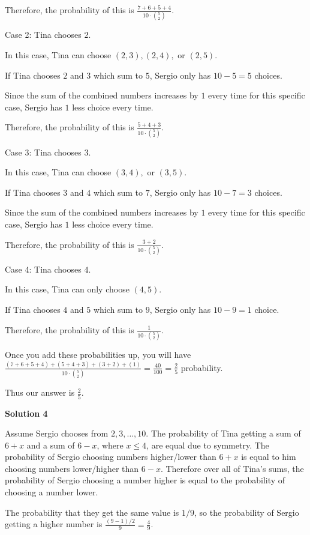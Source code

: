 \begin{enumerate}
 Therefore, the probability of this is $\frac{7+6+5+4}{10 \cdot \binom{5}{2}}$.

 Case 2: Tina chooses $2$.

 In this case, Tina can choose $(2, 3), (2, 4),$ or $(2, 5).$

 If Tina chooses $2$ and $3$ which sum to $5$, Sergio only has $10-5=5$ choices.

 Since the sum of the combined numbers increases by $1$ every time for this specific case, Sergio has $1$ less choice every time.

 Therefore, the probability of this is $\frac{5+4+3}{10 \cdot \binom{5}{2}}$.

 Case 3: Tina chooses $3$.

 In this case, Tina can choose $(3, 4),$ or $(3, 5).$

 If Tina chooses $3$ and $4$ which sum to $7$, Sergio only has $10-7=3$ choices.

 Since the sum of the combined numbers increases by $1$ every time for this specific case, Sergio has $1$ less choice every time.

 Therefore, the probability of this is $\frac{3+2}{10 \cdot \binom{5}{2}}$.

 Case 4: Tina chooses $4$.

 In this case, Tina can only choose $(4,5).$

 If Tina chooses $4$ and $5$ which sum to $9$, Sergio only has $10-9=1$ choice.

 Therefore, the probability of this is $\frac{1}{10 \cdot \binom{5}{2}}$.

 Once you add these probabilities up, you will have $\frac{(7+6+5+4)+(5+4+3)+(3+2)+(1)}{10 \cdot\binom{5}{2}} = \frac{40}{100} = \frac{2}{5}$ probability.

 Thus our answer is $\frac{2}{5}$.

 



\textbf{Solution 4}

Assume Sergio chooses from ${2,3,\ldots,10}$. The probability of Tina getting a sum of $6+x$ and a sum of $6-x$, where $x \leq 4$, are equal due to symmetry. The probability of Sergio choosing numbers higher/lower than $6+x$ is equal to him choosing numbers lower/higher than $6-x$. Therefore over all of Tina's sums, the probability of Sergio choosing a number higher is equal to the probability of choosing a number lower. 

 The probability that they get the same value is $1/9$, so the probability of Sergio getting a higher number is $\frac{(9-1)/2}{9} = \frac49$. 


\end{enumerate}
